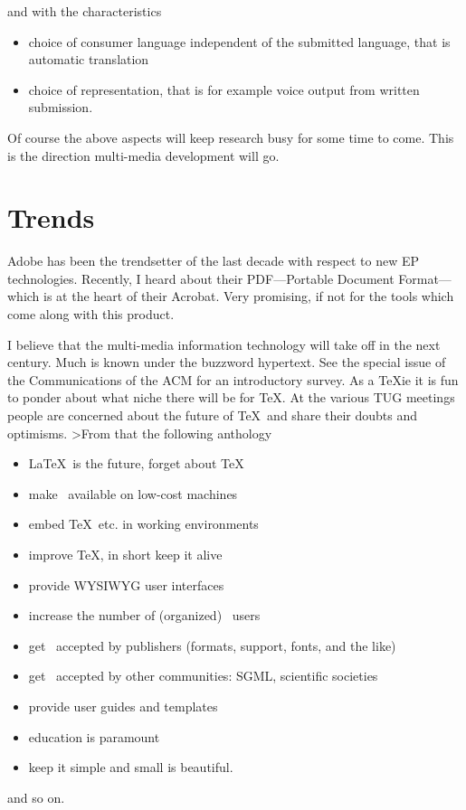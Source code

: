 \noindent and with the characteristics
\begin{itemize}
\item choice of consumer language independent of the submitted language,
      that is automatic translation
\item choice of representation, that is for example voice
      output from written submission.
\end{itemize}
\noindent
Of course the above aspects will
keep research busy for some time to come.
This is the direction multi-media development will go.

\section{Trends}
Adobe has been the trendsetter of the last decade with respect to new
EP technologies. Recently, I heard about their
PDF---Portable Document Format---which is at the heart of their
Acrobat. Very promising, if not for the tools which come along
with this product.

I believe that the multi-media information technology will take off in
the next century.
Much is known under the buzzword hypertext.
See the special issue of the Communications of the ACM for
an introductory survey.
As a \TeX ie it is fun to ponder about what niche
there will be for \TeX. At the various TUG meetings people are concerned
about the future of \TeX\ and share their doubts and optimisms.
>From that the following anthology
\begin{itemize}
\item \LaTeX\ is the future, forget about \TeX
\item make \AllTeX\ available on low-cost machines
\item embed \TeX\ etc. in working environments
\item improve \TeX, in short keep it alive
\item provide WYSIWYG user interfaces
\item increase the number of (organized) \AllTeX\ users
\item get \AllTeX\ accepted by publishers (formats, support, fonts,
      and the like)
\item get \AllTeX\ accepted by other communities: SGML,
      scientific societies
\item provide user guides and templates
\item education is paramount
\item keep it simple and small is beautiful.
\end{itemize}
\noindent and so on.
